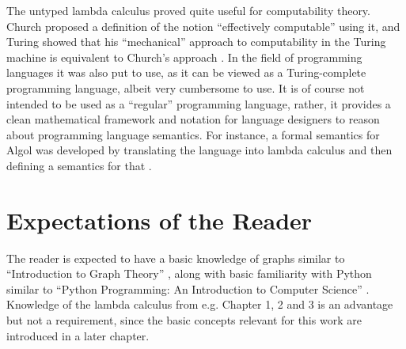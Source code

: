 The untyped lambda calculus proved quite useful for computability theory.
Church proposed a definition of the notion ``effectively computable'' using
it, and Turing showed that his ``mechanical'' approach to computability in the
Turing machine is equivalent to Church's approach
\cite{Turing1936,Turing1937}. In the field of programming languages it was
also put to use, as it can be viewed as a Turing-complete programming
language, albeit very cumbersome to use. It is of course not intended to be
used as a ``regular'' programming language, rather, it provides a clean
mathematical framework and notation for language designers to reason about
programming language semantics. For instance, a formal semantics for Algol was
developed by translating the language into lambda calculus and then defining a
semantics for that \cite{Landin1965}.

\section{Expectations of the Reader}

The reader is expected to have a basic knowledge of graphs similar to
``Introduction to Graph Theory'' \cite{Trudeau1994}, along with basic
familiarity with Python similar to ``Python Programming: An Introduction to
Computer Science'' \cite{Zelle2004}. Knowledge of the lambda calculus from e.g.
\cite{Barendregt} Chapter 1, 2 and 3 is an advantage but not a requirement,
since the basic concepts relevant for this work are introduced in a later
chapter.
